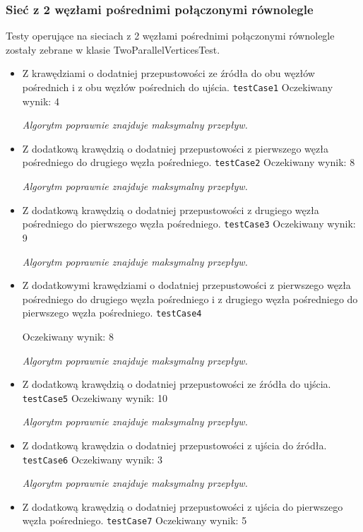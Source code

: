 \subsubsection{Sieć z 2 węzłami pośrednimi połączonymi równolegle}
Testy operujące na sieciach z 2 węzłami pośrednimi połączonymi równolegle zostały
zebrane w klasie TwoParallelVerticesTest.
\begin{itemize}[nosep]
    \item Z krawędziami o dodatniej przepustowości ze źródła do obu węzłów
    pośrednich i z obu węzłów pośrednich do ujścia.
    \texttt{testCase1}
    Oczekiwany wynik: 4

    \emph{Algorytm poprawnie znajduje maksymalny przepływ.}

    \item Z dodatkową krawędzią o dodatniej przepustowości z pierwszego węzła
    pośredniego do drugiego węzła pośredniego.
    \texttt{testCase2}
    Oczekiwany wynik: 8

    \emph{Algorytm poprawnie znajduje maksymalny przepływ.}

    \item Z dodatkową krawędzią o dodatniej przepustowości z drugiego węzła
    pośredniego do pierwszego węzła pośredniego.
    \texttt{testCase3}
    Oczekiwany wynik: 9

    \emph{Algorytm poprawnie znajduje maksymalny przepływ.}

    \item Z dodatkowymi krawędziami o dodatniej przepustowości z pierwszego
    węzła pośredniego do drugiego węzła pośredniego i z drugiego węzła
    pośredniego do pierwszego węzła pośredniego.
    \texttt{testCase4}

    Oczekiwany wynik: 8

    \emph{Algorytm poprawnie znajduje maksymalny przepływ.}

    \item Z dodatkową krawędzią o dodatniej przepustowości ze źródła do ujścia.
    \texttt{testCase5}
    Oczekiwany wynik: 10

    \emph{Algorytm poprawnie znajduje maksymalny przepływ.}

    \item Z dodatkową krawędzia o dodatniej przepustowości z ujścia do źródła.
    \texttt{testCase6}
    Oczekiwany wynik: 3

    \emph{Algorytm poprawnie znajduje maksymalny przepływ.}

    \item Z dodatkową krawędzią o dodatniej przepustowości z ujścia do
    pierwszego węzła pośredniego.
    \texttt{testCase7}
    Oczekiwany wynik: 5


\end{itemize}
